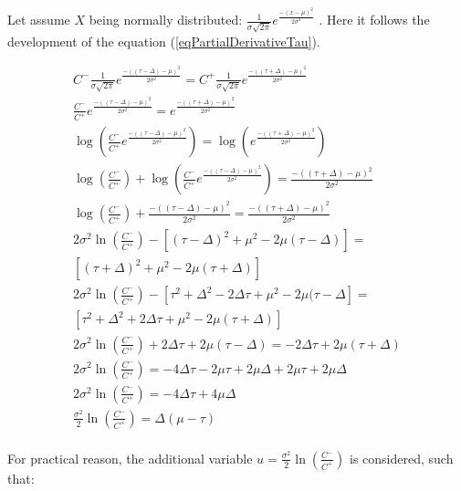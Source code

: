 Let assume $X$ being normally distributed: $\frac{1}{\sigma\sqrt{2\pi}}e^\frac{-\left(x-\mu\right)^2}{2\sigma^2}$ . Here it follows the development of the equation (\ref{eqPartialDerivativeTau}).

\begin{equation}
    \begin{split}
        C^{-}\frac{1}{\sigma\sqrt{2\pi}}e^{\frac{-((\tau-\Delta)-\mu)^2}{2\sigma^2}}=
        C^{+}\frac{1}{\sigma\sqrt{2\pi}}e^{\frac{-((\tau+\Delta)-\mu)^2}{2\sigma^2}}\\
        \frac{C^{-}}{C^{+}}e^{\frac{-((\tau-\Delta)-\mu)^2}{2\sigma^2}}=e^{\frac{-((\tau+\Delta)-\mu)^2}{2\sigma^2}}\\
        \log{\left(\frac{C^{-}}{C^{+}}e^{\frac{-((\tau-\Delta)-\mu)^2}{2\sigma^2}}\right)}=\log{\left(e^{\frac{-((\tau+\Delta)-\mu)^2}{2\sigma^2}}\right)}\\
        \log{\left( \frac{C^-}{C^+} \right)} + \log{\left(\frac{C^{-}}{C^{+}}e^{\frac{-((\tau-\Delta)-\mu)^2}{2\sigma^2}}\right)} = \frac{-((\tau + \Delta)-\mu)^2}{2\sigma^2}\\
        \log{\left( \frac{C^-}{C^+} \right)} + \frac{-((\tau - \Delta)-\mu)^2}{2\sigma^2} = \frac{-((\tau + \Delta)-\mu)^2}{2\sigma^2}\\
        2\sigma^2\ln{\left(\frac{C^-}{C^+}\right)} - \left[(\tau - \Delta)^2 + \mu^2 -2\mu(\tau - \Delta)\right] = \\ \left[(\tau + \Delta)^2 + \mu^2 -2\mu(\tau + \Delta)\right]\\
        2\sigma^2\ln{\left(\frac{C^-}{C^+}\right)} - \left[ \tau^2 + \Delta^2 - 2\Delta\tau + \mu^2 -2\mu(\tau - \Delta \right] = \\ \left[ \tau^2 + \Delta^2 + 2\Delta\tau + \mu^2 -2\mu(\tau + \Delta)\right]\\
         2\sigma^2\ln{\left(\frac{C^-}{C^+}\right)} + 2\Delta\tau + 2\mu(\tau - \Delta) = -2\Delta\tau + 2\mu(\tau + \Delta)\\
          2\sigma^2\ln{\left(\frac{C^-}{C^+}\right)} = -4\Delta\tau - 2\mu\tau + 2\mu\Delta + 2\mu\tau + 2\mu\Delta\\
          2\sigma^2\ln{\left(\frac{C^-}{C^+}\right)} = -4\Delta\tau + 4\mu\Delta\\
          \frac{\sigma^2}{2}\ln{\left(\frac{C^-}{C^+}\right)} = \Delta(\mu-\tau)\\
    \end{split}
\end{equation}

For practical reason, the additional variable $u=\frac{\sigma^2}{2}\ln{\left(\frac{C^-}{C^+}\right)}$ is considered, such that:

